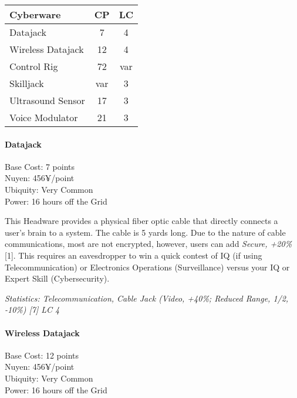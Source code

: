 \begin{multicols*}{3}
	\begin{center}
		\begin{tabularx}{0.32\textwidth}{|X|c|c|}
			\hline
			Cyberware & CP & LC\\
			\hline
			\hline
			Datajack & 7 & 4\\
			Wireless Datajack & 12 & 4\\
			Control Rig & 72 & var\\
			Skilljack & var & 3 \\
			Ultrasound Sensor & 17 & 3 \\
			Voice Modulator & 21 & 3 \\
			\hline
		\end{tabularx}
	\end{center}
	
	\paragraph{Datajack}
	\begin{flushright}
		Base Cost: 7 points\\
		Nuyen: 456¥/point\\
		Ubiquity: Very Common\\
		Power: 16 hours off the Grid\\
	\end{flushright}
	
	This Headware provides a physical fiber optic cable that directly connects a user's brain to a system. The cable is 5 yards long. Due to the nature of cable communications, most are not encrypted, however, users can add \textit{Secure, +20\%} [1]. This requires an eavesdropper to win a quick contest of IQ (if using Telecommunication) or Electronics Operations (Surveillance) versus your IQ or Expert Skill (Cybersecurity).
	
	\textit{\textcolor{OliveGreen}{Statistics: Telecommunication, Cable Jack (Video, +40\%; Reduced Range, 1/2, -10\%) [7] LC 4}}
	
	\paragraph{Wireless Datajack}
	\begin{flushright}
		Base Cost: 12 points\\
		Nuyen: 456¥/point\\
		Ubiquity: Very Common\\
		Power: 16 hours off the Grid\\
	\end{flushright}
	

\end{multicols*}
